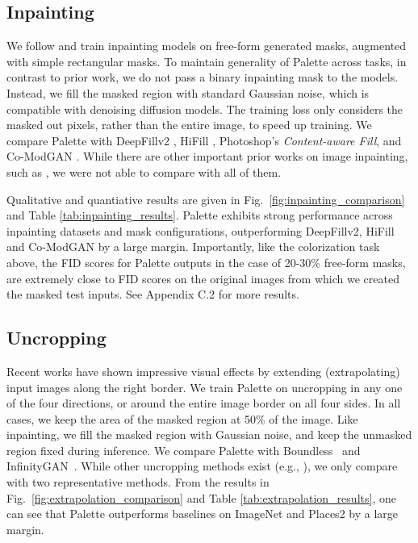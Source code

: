 \subsection{Inpainting}

We follow \cite{yu2019free} and train inpainting models on free-form generated masks, augmented with simple rectangular masks. To maintain generality of Palette across tasks, in contrast to prior work, we do not pass a binary inpainting mask to the models. Instead, we fill the masked region with standard Gaussian noise, which is compatible with denoising diffusion models. The training loss only considers the masked out pixels, rather than the entire image, to speed up training. We compare Palette with DeepFillv2 \citep{yu2019free}, HiFill \citep{yi2020contextual}, Photoshop's \textit{Content-aware Fill}, and Co-ModGAN \citep{zhao2021large}. While there are other important prior works on image inpainting, such as \citep{liu2018image, liu2020rethinking, zheng2019pluralistic}, we were not able to compare with all of them.

Qualitative and quantiative results are given in Fig.\ \ref{fig:inpainting_comparison} and Table \ref{tab:inpainting_results}. Palette exhibits strong performance across inpainting datasets and mask configurations, outperforming DeepFillv2, HiFill and Co-ModGAN by a large margin. Importantly, like the colorization task above, the FID scores for Palette outputs in the case of  20-30\% free-form masks, are extremely close to FID scores on the original images from which we created the masked test inputs. See Appendix C.2 for more results.

\subsection{Uncropping} 

Recent works \citep{teterwak2019boundless,lin2021infinitygan} have shown impressive visual effects by extending (extrapolating) input images along the right border. We train Palette on uncropping in any one of the four directions, or around the entire image border on all four sides. In all cases, we keep the area of the masked region at 50\% of the image. Like inpainting, we fill the masked region with Gaussian noise, and keep the unmasked region fixed during inference. We compare Palette with  Boundless~\citep{teterwak2019boundless} and InfinityGAN~\citep{lin2021infinitygan}. While other uncropping methods exist (e.g., \citep{guo2020spiral, wang2019wide}), we only compare with  two representative methods. From the results in Fig.\ \ref{fig:extrapolation_comparison} and Table \ref{tab:extrapolation_results}, one can see that Palette outperforms baselines on  ImageNet and Places2 by a large margin.

